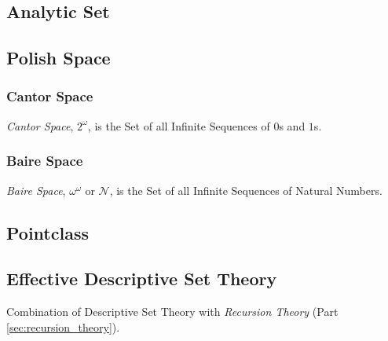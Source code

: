 \subsection{Analytic Set}\label{sec:analytic_set}

\subsection{Polish Space}\label{sec:polish_space}

\subsubsection{Cantor Space}\label{sec:cantor_space}

\emph{Cantor Space}, $2^{\omega}$, is the Set of all Infinite
Sequences of $0$s and $1$s.



\subsubsection{Baire Space}\label{sec:baire_space}

\emph{Baire Space}, $\omega^{\omega}$ or $\mathcal{N}$, is the Set of
all Infinite Sequences of Natural Numbers.



\subsection{Pointclass}\label{sec:pointclass}

\subsection{Effective Descriptive Set Theory}
\label{sec:effective_descriptive}

Combination of Descriptive Set Theory with \emph{Recursion Theory}
(Part \ref{sec:recursion_theory}).

